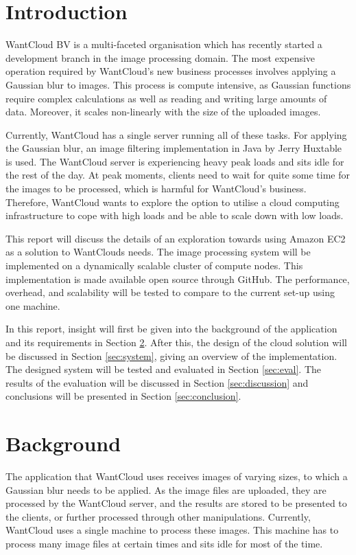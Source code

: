 \documentclass{acm_proc_article-sp}
\begin{document}
\section{Introduction}
\label{sec:intro}
WantCloud BV is a multi-faceted organisation which has recently started a development branch in the image processing domain.
The most expensive operation required by WantCloud's new business processes involves applying a Gaussian blur to images.
This process is compute intensive, as Gaussian functions require complex calculations as well as reading and writing large amounts of data.
Moreover, it scales non-linearly with the size of the uploaded images.

Currently, WantCloud has a single server running all of these tasks.
For applying the Gaussian blur, an image filtering implementation in Java by Jerry Huxtable is used.\cite{web:huxtable}
The WantCloud server is experiencing heavy peak loads and sits idle for the rest of the day.
At peak moments, clients need to wait for quite some time for the images to be processed, which is harmful for WantCloud's business.
Therefore, WantCloud wants to explore the option to utilise a cloud computing infrastructure to cope with high loads and be able to scale down with low loads.

This report will discuss the details of an exploration towards using Amazon EC2\cite{web:ec2} as a solution to WantClouds needs.
The image processing system will be implemented on a dynamically scalable cluster of compute nodes.
This implementation is made available open source through GitHub\cite{web:git}.
The performance, overhead, and scalability will be tested to compare to the current set-up using one machine.

In this report, insight will first be given into the background of the application and its requirements in Section \ref{sec:bg}.
After this, the design of the cloud solution will be discussed in Section \ref{sec:system}, giving an overview of the implementation.
The designed system will be tested and evaluated in Section \ref{sec:eval}.
The results of the evaluation will be discussed in Section \ref{sec:discussion} and conclusions will be presented in Section \ref{sec:conclusion}.

\section{Background}
\label{sec:bg}
The application that WantCloud uses receives images of varying sizes, to which a Gaussian blur needs to be applied.
As the image files are uploaded, they are processed by the WantCloud server, and the results are stored to be presented to the clients, or further processed through other manipulations.
Currently, WantCloud uses a single machine to process these images.
This machine has to process many image files at certain times and sits idle for most of the time.
\end{document}
